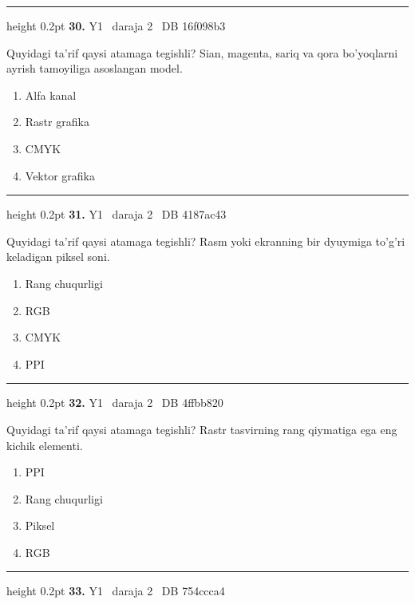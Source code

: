 \documentclass[10pt,a4paper,oneside]{article}
\begin{document}
\vspace{2mm}\hrule height 0.2pt \vspace{4mm}
\hypertarget{q30}{\textbf{\color{ink}30.}}  {\color{muted}\scriptsize Y1 \textbullet\ daraja 2 \textbullet\ DB 16f098b3}
\par
Quyidagi ta'rif qaysi atamaga tegishli? Sian, magenta, sariq va qora bo'yoqlarni ayrish tamoyiliga asoslangan model.
\begin{enumerate}[label=\Alph*),leftmargin=9mm]
\item Alfa kanal
\item Rastr grafika
\item CMYK
\item Vektor grafika
\end{enumerate}
\vspace{2mm}\hrule height 0.2pt \vspace{4mm}
\hypertarget{q31}{\textbf{\color{ink}31.}}  {\color{muted}\scriptsize Y1 \textbullet\ daraja 2 \textbullet\ DB 4187ac43}
\par
Quyidagi ta'rif qaysi atamaga tegishli? Rasm yoki ekranning bir dyuymiga to'g'ri keladigan piksel soni.
\begin{enumerate}[label=\Alph*),leftmargin=9mm]
\item Rang chuqurligi
\item RGB
\item CMYK
\item PPI
\end{enumerate}
\vspace{2mm}\hrule height 0.2pt \vspace{4mm}
\hypertarget{q32}{\textbf{\color{ink}32.}}  {\color{muted}\scriptsize Y1 \textbullet\ daraja 2 \textbullet\ DB 4ffbb820}
\par
Quyidagi ta'rif qaysi atamaga tegishli? Rastr tasvirning rang qiymatiga ega eng kichik elementi.
\begin{enumerate}[label=\Alph*),leftmargin=9mm]
\item PPI
\item Rang chuqurligi
\item Piksel
\item RGB
\end{enumerate}
\vspace{2mm}\hrule height 0.2pt \vspace{4mm}
\hypertarget{q33}{\textbf{\color{ink}33.}}  {\color{muted}\scriptsize Y1 \textbullet\ daraja 2 \textbullet\ DB 754ccca4}
\end{document}
